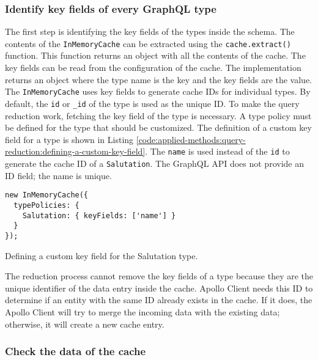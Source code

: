 \subsubsection{Identify key fields of every GraphQL type}

The first step is identifying the key fields of the types inside the schema. The contents of the \texttt{InMemoryCache} can be extracted using the \texttt{cache.extract()} function. This function returns an object with all the contents of the cache. The key fields can be read from the configuration of the cache. The implementation returns an object where the type name is the key and the key fields are the value. The \texttt{InMemoryCache} uses key fields to generate cache \acp{ID} for individual types. By default, the \texttt{id} or \texttt{\_id} of the type is used as the unique \ac{ID}. To make the query reduction work, fetching the key field of the type is necessary. A type policy must be defined for the type that should be customized. The definition of a custom key field for a type is shown in Listing \ref{code:applied-methods:query-reduction:defining-a-custom-key-field}. The \texttt{name} is used instead of the \texttt{id} to generate the cache \ac{ID} of a \texttt{Salutation}. The GraphQL API does not provide an \ac{ID} field; the name is unique. \cite{misc:-:background:graphql:apollo-client-cache-configuration}

\ifshowListings
\begin{listing}[H]
\begin{verbatim}
new InMemoryCache({
  typePolicies: {
    Salutation: { keyFields: ['name'] }
  }
});
\end{verbatim}
\caption{Defining a custom key field for the Salutation type.}\label{code:applied-methods:query-reduction:defining-a-custom-key-field}
\end{listing}
\fi

\noindent The reduction process cannot remove the key fields of a type because they are the unique identifier of the data entry inside the cache. Apollo Client needs this \ac{ID} to determine if an entity with the same \ac{ID} already exists in the cache. If it does, the Apollo Client will try to merge the incoming data with the existing data; otherwise, it will create a new cache entry.

\subsubsection{Check the data of the cache}

